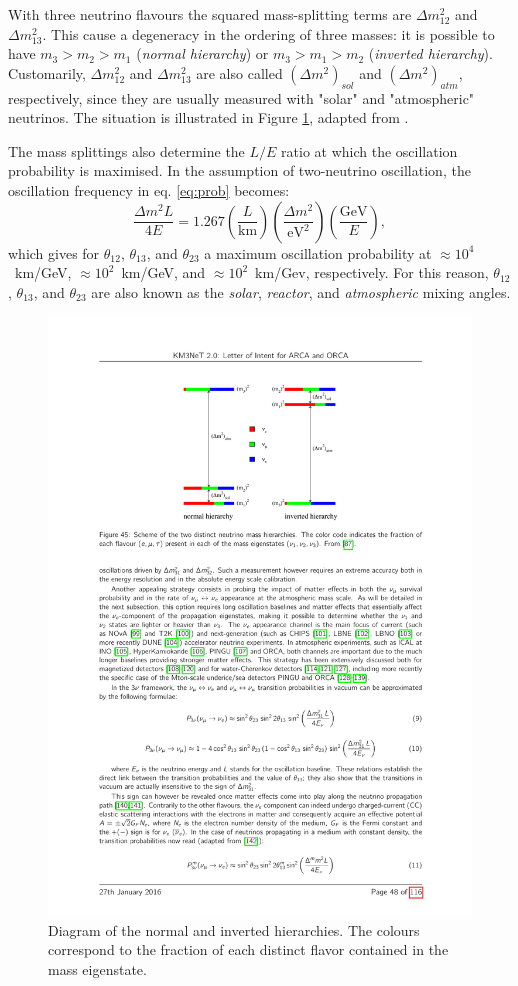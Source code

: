With three neutrino flavours the squared mass-splitting terms are $\Delta m_{12}^2$ and $\Delta m_{13}^2$. This cause a degeneracy in the ordering of three masses: it is possible to have $m_3 > m_2 > m_1$ (\emph{normal hierarchy}) or $m_3 > m_1 > m_2$ (\emph{inverted hierarchy}). Customarily, $\Delta m_{12}^2$ and $\Delta m_{13}^2$ are also called $(\Delta m^2)_{sol}$ and $(\Delta m^2)_{atm}$, respectively, since they are usually measured with "solar" and "atmospheric" neutrinos. The situation is illustrated in Figure \ref{fig:masshierarchy}, adapted from \cite{Cahn:2013taa}.

The mass splittings also determine the $L/E$ ratio at which the oscillation probability is maximised. In the assumption of two-neutrino oscillation, the oscillation frequency in eq. \eqref{eq:prob} becomes:
\begin{equation}
     \frac{\Delta m^{2}L}{4E} = 1.267\left(\frac{L}{\mathrm{km}}\right)\left(\frac{\Delta m^2}{\mathrm{eV}^2}\right)\left(\frac{\mathrm{GeV}}{E}\right),
\end{equation} 
which gives for $\theta_{12}$, $\theta_{13}$, and $\theta_{23}$ a maximum oscillation probability at $\approx 10^4$~km/GeV, $\approx 10^2$~km/GeV, and $\approx 10^2$~km/Gev, respectively. For this reason, $\theta_{12}$, $\theta_{13}$, and $\theta_{23}$ are also known as the \emph{solar}, \emph{reactor}, and \emph{atmospheric} mixing angles.

\begin{figure}
    \centering
    \includegraphics[width=0.75\linewidth]{figures/masshierarchy.pdf}
    \caption{Diagram of the normal and inverted hierarchies. The colours correspond to the fraction of each distinct flavor contained in the mass eigenstate.}
    \label{fig:masshierarchy}
\end{figure}

